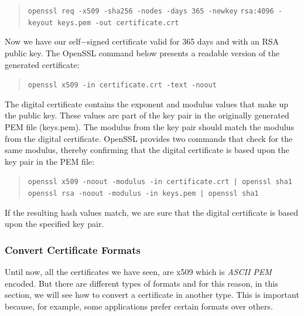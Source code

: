 \documentclass[11pt]{article}
\begin{document}
\begin{quote}
 \verb|openssl req -x509 -sha256 -nodes -days 365 -newkey|\newline
 \verb|rsa:4096 -keyout keys.pem -out certificate.crt|
\end{quote}

Now we have our self$-$signed certificate valid for 365 days and with an RSA public key. The OpenSSL command below presents a readable version of the generated certificate:

\begin{quote}
 \verb|openssl x509 -in certificate.crt -text -noout|
\end{quote}

The digital certificate contains the exponent and modulus values that make up the public key. These values are part of the key pair in the originally generated PEM file (keys.pem). The modulus from the key pair should match the modulus from the digital certificate. OpenSSL provides two commands that check for the same modulus, thereby confirming that the digital certificate is based upon the key pair in the PEM file:

\begin{quote}
 \texttt{openssl x509 -noout -modulus -in certificate.crt | openssl sha1} \newline
 \texttt{openssl rsa -noout -modulus -in keys.pem | openssl sha1}
\end{quote}

If the resulting hash values match, we are sure that the digital certificate is based upon the specified key pair.

\subsubsection{Convert Certificate Formats}
Until now, all the certificates we have seen, are x509 which is {\em ASCII PEM} encoded. But there are different types of formats and for this reason, in this section, we will see how to convert a certificate in another type. This is important because, for example, some applications prefer certain formats over others.
\end{document}
